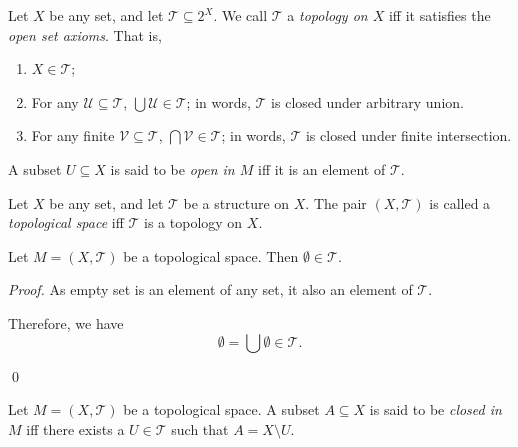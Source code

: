 \begin{definition}
	\label{definition: open set axioms}
	Let $X$ be any set, and let $\mathcal T \subseteq 2^X$. We call $\mathcal T$ a \textit{topology on $X$} iff it satisfies the \textit{open set axioms}. That is,
	\begin{enumerate}[\bfseries O1.]
		\item $X \in \mathcal T$;
		\item For any $\mathcal U \subseteq \mathcal T$, $\bigcup \mathcal U \in \mathcal T$; in words, $\mathcal T$ is closed under arbitrary union.
		\item For any finite $\mathcal V \subseteq \mathcal T$, $\bigcap \mathcal V \in \mathcal T$; in words, $\mathcal T$ is closed under finite intersection.
	\end{enumerate}
	
	A subset $U \subseteq X$ is said to be \textit{open in $M$} iff it is an element of $\mathcal T$.
\end{definition}


\begin{definition}
	\label{definition: topological space}
	Let $X$ be any set, and let $\mathcal T$ be a structure on $X$. The pair $(X, \mathcal T)$ is called a \textit{topological space} iff $\mathcal T$ is a topology on $X$.
\end{definition}


\begin{theorem}
	\label{theorem: empty set is an element of topology}
	Let $M = (X, \mathcal T)$ be a topological space. Then $\emptyset \in \mathcal T$.
	
	\begin{proof}
		As empty set is an element of any set, it also an element of $\mathcal T$.
		
		Therefore, we have
		$$
		\emptyset = \bigcup \emptyset \in \mathcal T.
		$$
		
		\qed
	\end{proof}
\end{theorem}


\begin{definition}
	\label{definition: closed set}
	Let $M = (X, \mathcal T)$ be a topological space. A subset $A \subseteq X$ is said to be \textit{closed in $M$} iff there exists a $U \in \mathcal T$ such that $A = X \setminus U$.
\end{definition}


